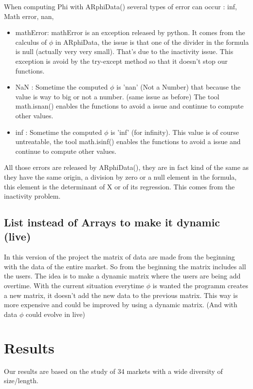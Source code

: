 \documentclass{report}
\begin{document}
When computing Phi with ARphiData() several types of error can occur : inf, Math error, nan, 
\begin{itemize}
\item mathError: mathError is an exception released by python. It comes from the calculus of $\phi $ in ARphiData, the issue is that one of the divider in the formula is null (actually very very small). That's due to the inactivity issue. This exception is avoid by the try-except method so that it doesn't stop our functions.
\item NaN : Sometime the computed $\phi $ is 'nan' (Not a Number) that because the value is way to big or not a number. (same issue as before) The tool math.isnan() enables the functions to avoid a issue and continue to compute other values.
\item inf : Sometime the computed $\phi $ is 'inf' (for infinity). This value is of course untreatable, the tool math.isinf() enables the functions to avoid a issue and continue to compute other values.
\end{itemize}

All those errors are released by ARphiData(), they are in fact kind of the same as they have the same origin, a division by zero or a null element in the formula, this element is the determinant of X or of its regression. This comes from the inactivity problem.



\section{List instead of Arrays to make it dynamic (live)}

In this version of the project the matrix of data are made from the beginning with the data of the entire market. So from the beginning the matrix includes all the users. The idea is to make a dynamic matrix where the users are being add overtime. With the current situation everytime $\phi $ is wanted the programm creates a new matrix, it doesn't add the new data to the previous matrix. This way is more expensive and could be improved by using a dynamic matrix. (And with data $\phi $ could evolve in live)

\chapter{Results}

Our results are based on the study of 34 markets with a wide diversity of size/length. 
\end{document}
